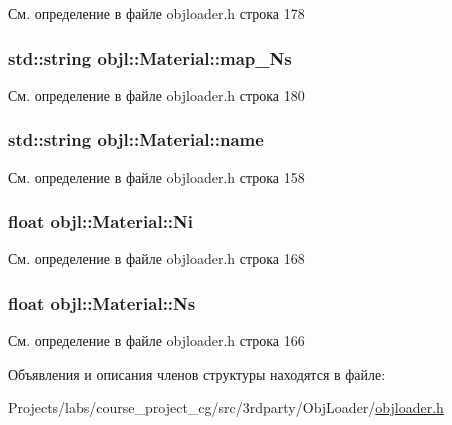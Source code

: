 См. определение в файле objloader.\+h строка 178

\subsubsection[{\texorpdfstring{map\+\_\+\+Ns}{map_Ns}}]{\setlength{\rightskip}{0pt plus 5cm}std\+::string objl\+::\+Material\+::map\+\_\+\+Ns}\hypertarget{structobjl_1_1_material_a02919bada38d25c16ea2e2c4b2f514ec}{}\label{structobjl_1_1_material_a02919bada38d25c16ea2e2c4b2f514ec}


См. определение в файле objloader.\+h строка 180

\subsubsection[{\texorpdfstring{name}{name}}]{\setlength{\rightskip}{0pt plus 5cm}std\+::string objl\+::\+Material\+::name}\hypertarget{structobjl_1_1_material_ae018ffdcbb8dfa9ed36605b048bbfac1}{}\label{structobjl_1_1_material_ae018ffdcbb8dfa9ed36605b048bbfac1}


См. определение в файле objloader.\+h строка 158

\subsubsection[{\texorpdfstring{Ni}{Ni}}]{\setlength{\rightskip}{0pt plus 5cm}float objl\+::\+Material\+::\+Ni}\hypertarget{structobjl_1_1_material_a9b42dd253954cf9547593831fbbed8bc}{}\label{structobjl_1_1_material_a9b42dd253954cf9547593831fbbed8bc}


См. определение в файле objloader.\+h строка 168

\subsubsection[{\texorpdfstring{Ns}{Ns}}]{\setlength{\rightskip}{0pt plus 5cm}float objl\+::\+Material\+::\+Ns}\hypertarget{structobjl_1_1_material_ad02f64d02fa971cebc3195d90a73748c}{}\label{structobjl_1_1_material_ad02f64d02fa971cebc3195d90a73748c}


См. определение в файле objloader.\+h строка 166



Объявления и описания членов структуры находятся в файле\+:\begin{DoxyCompactItemize}
\item 
Projects/labs/course\+\_\+project\+\_\+cg/src/3rdparty/\+Obj\+Loader/\hyperlink{3rdparty_2_obj_loader_2objloader_8h}{objloader.\+h}\end{DoxyCompactItemize}
